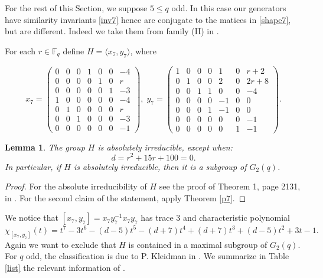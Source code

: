 \documentclass{amsart}
\newtheorem{lemma}{Lemma}[section]
\theoremstyle{remark}
\begin{document}
For the rest of this Section,  we suppose $5\le q$ odd. In this case  our generators have similarity invariants \eqref{inv7} hence are conjugate to the matices in \eqref{shape7}, but are different. Indeed we
take them from family (II) in \cite{TV2}. 

For each  $r\in {\mathbb{F}}_q$ define $H=\langle x_7,y_7\rangle$, where

\begin{equation}\label{7odd}
x_7=\begin{pmatrix}
 0 &  0 & 0 & 1 & 0 & 0 & -4\\
 0 &  0 & 0 & 0 & 1 & 0 & r \\
 0 &  0 & 0 & 0 & 0 & 1 & -3 \\
 1 &  0 & 0 & 0 & 0 & 0 & -4 \\
 0 &  1 & 0 & 0 & 0 & 0 & r \\
 0 &  0 & 1 & 0 & 0 & 0 & -3 \\
 0 &  0 & 0 & 0 & 0 & 0 & -1 
\end{pmatrix},\;
y_7=
\begin{pmatrix}
 1 & 0 & 0 & 0 & 1 & 0 & r+2\\
 0 & 1 & 0 & 0 & 2 & 0 & 2r+8\\
 0 & 0 & 1 & 1 & 0 & 0 & -4 \\ 
 0 & 0 & 0 & 0 &-1 & 0 & 0 \\
 0 & 0 & 0 & 1 &-1 & 0 & 0 \\
 0 & 0 & 0 & 0 & 0 & 0 & -1 \\ 
 0 & 0 & 0 & 0 & 0 & 1 & -1
\end{pmatrix}.
\end{equation}

\begin{lemma}\label{Irrodd}
The group $H$ is absolutely irreducible, except when:
$$d=r^2+15 r+ 100=0.$$
In particular, if $H$ is absolutely irreducible, then it is a subgroup of $G_2(q)$.
\end{lemma}

\begin{proof}
For the absolute irreducibility of $H$ see the proof of Theorem 1, page 2131, in \cite{TV2}.
For the second claim of the statement, apply Theorem   \ref{p7}. 
\end{proof}
We notice that $[x_7,y_7]=x_7y_7^{-1}x_7y_7$ has trace $3$ and characteristic polynomial 
\begin{equation}\label{char7}
\chi_{[x_7,y_7]}(t)=t^ 7 -3t^ 6  -(d-5) t^ 5 -(d+7) t^ 4 + (d+7) t^ 3 + (d-5)t^ 2+3t-1.
\end{equation}
Again we want  to exclude that $H$ 
is contained in a maximal subgroup of $G_2(q)$. For $q$ odd, the classification is due 
to P. Kleidman in \cite{K}. We summarize in Table \ref{list} the relevant information of 
\cite[Tables 8.41, 8.42 pages 397--398]{H}.
\end{document}
